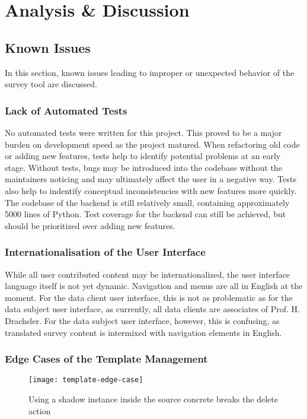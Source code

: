\section{Analysis \& Discussion}

    \subsection{Known Issues}
    	In this section, known issues leading to improper or unexpected
    	behavior of the survey tool are discussed.

    	\subsubsection{Lack of Automated Tests}
    		No automated tests were written for this project. This proved
    		to be a major burden on development speed as the project
    		matured. When refactoring old code or adding new features,
    		tests help to identify potential problems at an early stage.
    		Without tests, bugs may be introduced into the codebase
    		without the maintainers noticing and may ultimately
    		affect the user in a negative way. Tests also
    		help to indentify conceptual inconsistencies
    		with new features more quickly. The codebase of the
    		backend is still relatively small, containing
    		approximately 5000 lines of Python. Test coverage for
    		the backend can still be achieved, but should be prioritized
    		over adding new features.

    	\subsubsection{Internationalisation of the User Interface}
    		While all user contributed content may be internationalized,
    		the user interface language itself is not yet dynamic.
    		Navigation and menus are all in English at the moment.
    		For the data client user interface, this is not as
    		problematic as for the data subject user interface, as 
    		currently, all data clients are associates of Prof. H. Drachsler.
    		For the data subject user interface, however, this is confusing,
    		as translated survey content is intermixed with
    		navigation elements in English.

    	\subsubsection{Edge Cases of the Template Management}
        \label{analysis:known-issues:template-management-edge-cases}
    		\begin{figure}
    			\centering
    			\texttt{[image: template-edge-case]}
    			\caption{Using a shadow instance inside the source concrete breaks the delete action}
    			\label{fig:shadow-breaks-delete}
    		\end{figure}

